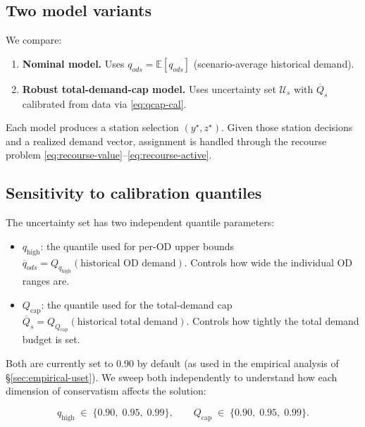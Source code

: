 \documentclass[11pt]{article}
\newcommand{\E}{\mathbb{E}}
\newcommand{\cU}{\mathcal{U}}
\theoremstyle{definition}
\begin{document}
\subsection{Two model variants}
\label{sec:variants}

We compare:
\begin{enumerate}
	\item \textbf{Nominal model.}  Uses $q_{ods} = \E[q_{ods}]$ (scenario-average
	      historical demand).
	\item \textbf{Robust total-demand-cap model.}  Uses uncertainty set $\cU_s$
	      with $\overline{Q}_s$ calibrated from data via \eqref{eq:qcap-cal}.
\end{enumerate}

Each model produces a station selection $(y^\star, z^\star)$.  Given those
station decisions and a realized demand vector, assignment is handled through
the recourse problem \eqref{eq:recourse-value}--\eqref{eq:recourse-active}.

\subsection{Sensitivity to calibration quantiles}
\label{sec:cap-sweep}

The uncertainty set has two independent quantile parameters:
\begin{itemize}
	\item $q_{\mathrm{high}}$: the quantile used for per-OD upper bounds
	      $\overline{q}_{ods} = Q_{q_{\mathrm{high}}}(\text{historical OD demand})$.
	      Controls how wide the individual OD ranges are.
	\item $Q_{\mathrm{cap}}$: the quantile used for the total-demand cap
	      $\overline{Q}_s = Q_{Q_{\mathrm{cap}}}(\text{historical total demand})$.
	      Controls how tightly the total demand budget is set.
\end{itemize}

Both are currently set to 0.90 by default (as used in the empirical analysis of
\S\ref{sec:empirical-uset}).  We sweep both independently to understand how
each dimension of conservatism affects the solution:

\[
	q_{\mathrm{high}} \;\in\; \{0.90,\; 0.95,\; 0.99\},
	\qquad
	Q_{\mathrm{cap}}  \;\in\; \{0.90,\; 0.95,\; 0.99\}.
\]
\end{document}
